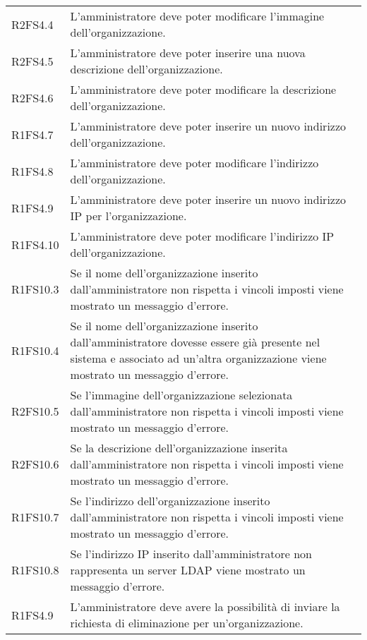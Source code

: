 {\begin{longtable}{ >{\centering}p{} >{}p{}}
R2FS4.4 & L'amministratore deve poter modificare l'immagine dell'organizzazione.\\

R2FS4.5 & L'amministratore deve poter inserire una nuova descrizione dell'organizzazione. \\

R2FS4.6 & L'amministratore deve poter modificare la descrizione dell'organizzazione. \\

R1FS4.7 & L'amministratore deve poter inserire un nuovo indirizzo dell'organizzazione.\\

R1FS4.8 & L'amministratore deve poter modificare l'indirizzo dell'organizzazione. \\

R1FS4.9 & L'amministratore deve poter inserire un nuovo indirizzo IP per l'organizzazione. \\

R1FS4.10 & L'amministratore deve poter modificare l'indirizzo IP dell'organizzazione. \\

R1FS10.3 & Se il nome dell'organizzazione inserito dall'amministratore non rispetta i vincoli imposti viene mostrato un messaggio d'errore. \\

R1FS10.4 & Se il nome dell'organizzazione inserito dall'amministratore dovesse essere già presente nel sistema e associato ad un'altra organizzazione viene mostrato un messaggio d'errore. \\

R2FS10.5 & Se l'immagine dell'organizzazione selezionata dall'amministratore non rispetta i vincoli imposti viene mostrato un messaggio d'errore.\\

R2FS10.6 & Se la descrizione dell'organizzazione inserita dall'amministratore non rispetta i vincoli imposti viene mostrato un messaggio d'errore.\\

R1FS10.7 & Se l'indirizzo dell'organizzazione inserito dall'amministratore non rispetta i vincoli imposti viene mostrato un messaggio d'errore. \\

R1FS10.8 & Se l'indirizzo IP inserito dall'amministratore non rappresenta un server LDAP viene mostrato un messaggio d'errore. \\

R1FS4.9 & L'amministratore deve avere la possibilità di inviare la richiesta di eliminazione per un'organizzazione. \\


\end{longtable}}
